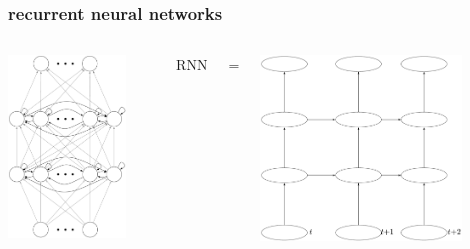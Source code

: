\documentclass[USenglish,pdftex,compress,10pt,svgnamesi,handout]{beamer}
\begin{document}
\begin{frame}
\frametitle{recurrent neural networks}

\begin{columns}
\includegraphics[width=0.8\textwidth]{RNN}

\centerline{RNN}
\centerline{=}
\includegraphics[width=0.8\textwidth]{RNN-rollout}


\end{columns}
\end{frame}
\end{document}
